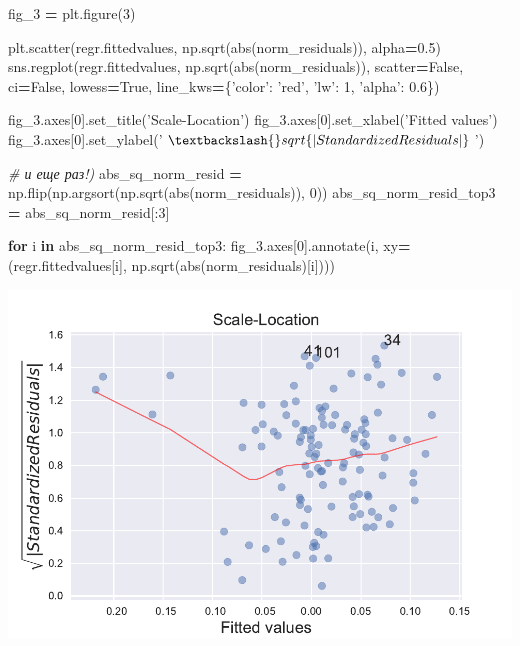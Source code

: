 \documentclass[]{book}
\newenvironment{Shaded}{\begin{snugshade}}{\end{snugshade}}
\newcommand{\BuiltInTok}[1]{#1}
\newcommand{\CommentTok}[1]{\textcolor[rgb]{0.56,0.35,0.01}{\textit{#1}}}
\newcommand{\ControlFlowTok}[1]{\textcolor[rgb]{0.13,0.29,0.53}{\textbf{#1}}}
\newcommand{\DecValTok}[1]{\textcolor[rgb]{0.00,0.00,0.81}{#1}}
\newcommand{\FloatTok}[1]{\textcolor[rgb]{0.00,0.00,0.81}{#1}}
\newcommand{\KeywordTok}[1]{\textcolor[rgb]{0.13,0.29,0.53}{\textbf{#1}}}
\newcommand{\NormalTok}[1]{#1}
\newcommand{\OperatorTok}[1]{\textcolor[rgb]{0.81,0.36,0.00}{\textbf{#1}}}
\newcommand{\StringTok}[1]{\textcolor[rgb]{0.31,0.60,0.02}{#1}}
\newcommand{\VariableTok}[1]{\textcolor[rgb]{0.00,0.00,0.00}{#1}}
\begin{document}
\begin{Shaded}
\begin{Highlighting}[]
\NormalTok{fig_3 }\OperatorTok{=}\NormalTok{ plt.figure(}\DecValTok{3}\NormalTok{)}

\NormalTok{plt.scatter(regr.fittedvalues, np.sqrt(}\BuiltInTok{abs}\NormalTok{(norm_residuals)), alpha}\OperatorTok{=}\FloatTok{0.5}\NormalTok{)}
\NormalTok{sns.regplot(regr.fittedvalues, np.sqrt(}\BuiltInTok{abs}\NormalTok{(norm_residuals)), }
\NormalTok{            scatter}\OperatorTok{=}\VariableTok{False}\NormalTok{, }
\NormalTok{            ci}\OperatorTok{=}\VariableTok{False}\NormalTok{, }
\NormalTok{            lowess}\OperatorTok{=}\VariableTok{True}\NormalTok{,}
\NormalTok{            line_kws}\OperatorTok{=}\NormalTok{\{}\StringTok{'color'}\NormalTok{: }\StringTok{'red'}\NormalTok{, }\StringTok{'lw'}\NormalTok{: }\DecValTok{1}\NormalTok{, }\StringTok{'alpha'}\NormalTok{: }\FloatTok{0.6}\NormalTok{\})}

\NormalTok{fig_3.axes[}\DecValTok{0}\NormalTok{].set_title(}\StringTok{'Scale-Location'}\NormalTok{)}
\NormalTok{fig_3.axes[}\DecValTok{0}\NormalTok{].set_xlabel(}\StringTok{'Fitted values'}\NormalTok{)}
\NormalTok{fig_3.axes[}\DecValTok{0}\NormalTok{].set_ylabel(}\StringTok{'$\textbackslash{}sqrt\{|Standardized Residuals|\}$'}\NormalTok{)}

\CommentTok{# и еще раз!)}
\NormalTok{abs_sq_norm_resid }\OperatorTok{=}\NormalTok{ np.flip(np.argsort(np.sqrt(}\BuiltInTok{abs}\NormalTok{(norm_residuals)), }\DecValTok{0}\NormalTok{))}
\NormalTok{abs_sq_norm_resid_top3 }\OperatorTok{=}\NormalTok{ abs_sq_norm_resid[:}\DecValTok{3}\NormalTok{]}

\ControlFlowTok{for}\NormalTok{ i }\KeywordTok{in}\NormalTok{ abs_sq_norm_resid_top3:}
\NormalTok{    fig_3.axes[}\DecValTok{0}\NormalTok{].annotate(i, xy}\OperatorTok{=}\NormalTok{(regr.fittedvalues[i], }
\NormalTok{                                   np.sqrt(}\BuiltInTok{abs}\NormalTok{(norm_residuals)[i])))}
\end{Highlighting}
\end{Shaded}

\includegraphics{02-simplereg_files/figure-latex/unnamed-chunk-20-1.pdf}
\end{document}
